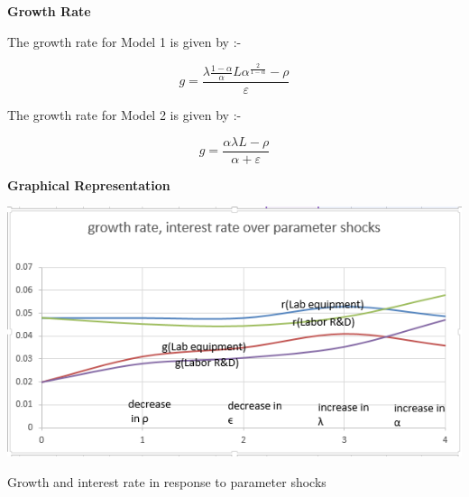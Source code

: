 \documentclass[a4paper, 12pt]{article}
\begin{document}
\newpage
\begin{flushleft}
	\textbf{Growth Rate}
	\begin{flushleft}
			The growth rate for Model 1 is given by :-
	\end{flushleft}
	\begin{center}
		$$ g = \frac{\lambda \frac{1-\alpha} {\alpha} L\alpha^{\frac {2} {1-\alpha}}-\rho } {\varepsilon} $$
	\end{center}
	\begin{flushleft}
		The growth rate for Model 2 is given by :-
	\end{flushleft}
	\begin{center}
		$$ g = \frac{\alpha \lambda L - \rho}{\alpha + \varepsilon} $$
	\end{center}
\end{flushleft}
\newpage
\begin{center}
	\textbf{Graphical Representation}
	
	\includegraphics{images/ExcelGraph}
	
	Growth and interest rate in response to parameter shocks
\end{center}
\newpage
\end{document}
